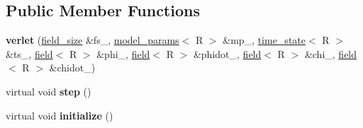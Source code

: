 \subsection*{Public Member Functions}
\begin{DoxyCompactItemize}
\item 
\hypertarget{classverlet_a1a51977dc9b12a64728c566c1f7278a5}{
{\bfseries verlet} (\hyperlink{structfield__size}{field\_\-size} \&fs\_\-, \hyperlink{structmodel__params}{model\_\-params}$<$ R $>$ \&mp\_\-, \hyperlink{structtime__state}{time\_\-state}$<$ R $>$ \&ts\_\-, \hyperlink{classfield}{field}$<$ R $>$ \&phi\_\-, \hyperlink{classfield}{field}$<$ R $>$ \&phidot\_\-, \hyperlink{classfield}{field}$<$ R $>$ \&chi\_\-, \hyperlink{classfield}{field}$<$ R $>$ \&chidot\_\-)}
\label{classverlet_a1a51977dc9b12a64728c566c1f7278a5}

\item 
\hypertarget{classverlet_aec84a4b02a724f576a230cf82f5de6c1}{
virtual void {\bfseries step} ()}
\label{classverlet_aec84a4b02a724f576a230cf82f5de6c1}

\item 
\hypertarget{classverlet_a2d3949c36534110a43b25184936282b5}{
virtual void {\bfseries initialize} ()}
\label{classverlet_a2d3949c36534110a43b25184936282b5}

\end{DoxyCompactItemize}
